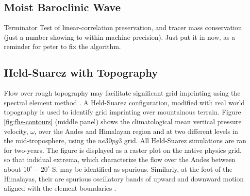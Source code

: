 \documentclass{agujournal}
\begin{document}
\subsection{Moist Baroclinic Wave}\label{sec:baroclinic}

{\color{red}Terminator Test of linear-correlation preservation, and tracer mass conservation (just a number showing to within machine precision). Just put it in now, as a reminder for peter to fix the algorithm.}

\subsection{Held-Suarez with Topography}\label{sec:hs94}

Flow over rough topography may facilitate significant grid imprinting using the spectral element method \citep{gmdd-8-4623-2015,HL2018MWR}. A Held-Suarez configuration, modified with real world topography is used to identify grid imprinting over mountainous terrain. Figure \ref{fig:fhs-contours} (middle panel) shows the climatological mean vertical pressure velocity, $\omega$, over the Andes and Himalayan region and at two different levels in the mid-troposphere, using the $ne30pg3$ grid. All Held-Suarez simulations are ran for two-years. The figure is displayed as a raster plot on the native physics grid, so that indidual extrema, which characterize the flow over the Andes between about $10^\circ-20^\circ$ S, may be identified as spurious. Similarly, at the foot of the Himalayas, their are spurious oscillatory bands of upward and downward motion aligned with the element boundaries \citep[see also ][]{HL2018MWR}. 
\end{document}
